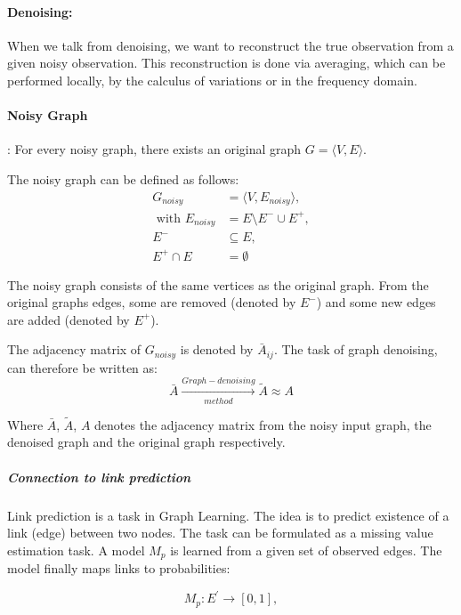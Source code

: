 \paragraph{Denoising:}
When we talk from denoising, we want to reconstruct the true observation 
from a given noisy observation. 
This reconstruction is done via averaging, which can be performed
locally, by the calculus of variations or in the frequency domain\cite{noneLocalMean}.

\paragraph{Noisy Graph}:
For every noisy graph, there exists an original graph $G = \langle V,E \rangle$.

The noisy graph can be defined as follows:
\begin{equation}
    \begin{aligned}
        G_{noisy} &= \langle V,E_{noisy} \rangle,  \\ 
        \text{ with }  E_{noisy} &= E \setminus  E^{-} \cup  E^{+}, \\ 
         E^{-} & \subseteq E, \\
         E^{+} \cap E &= \emptyset
    \end{aligned}
\end{equation}

The noisy graph consists of the same vertices as the original graph. From
the original graphs edges, some are removed (denoted by $E^{-}$) and some new edges are added
(denoted by $E^{+}$).

The adjacency matrix of $G_{noisy}$ is denoted by $\bar{A}_{ij}$.
The task of graph denoising, can therefore be written as:
\begin{equation}
    \bar{A} \xrightarrow[method]{Graph-denoising} \tilde{A} \approx A
\end{equation}

Where $\bar{A}$, $\tilde{A}$, $A$ denotes the adjacency matrix from the noisy input graph, the denoised
 graph and the original graph respectively.

\subparagraph{Connection to link prediction}
Link prediction is a task in Graph Learning. 
The idea is to predict existence of a link (edge) between two nodes.
The task can be formulated as a missing value estimation task. A model $M_p$ is learned
from a given set of observed edges. The model finally maps links to probabilities:


\begin{equation}
    M_p : E^{\prime} \rightarrow [0,1],
\end{equation}

